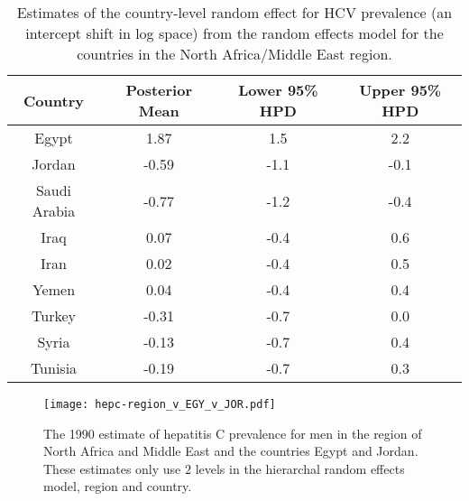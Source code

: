     \begin{table}[h]
        \begin{center}
        \begin{tabular}{|c|c|c|c|}
            \hline
                Country & Posterior Mean & Lower 95\% HPD  & Upper 95\%  HPD \\
            \hline
                Egypt	&	1.87	&	 1.5	&	2.2	\\
                Jordan	&	-0.59	&	-1.1	&	-0.1 \\
                Saudi Arabia	&	-0.77	&	-1.2	&	-0.4 \\
                Iraq	&	0.07	&	-0.4	&	0.6	\\
                Iran	&	0.02	&	-0.4	&	0.5	\\
                Yemen	&	0.04	&	-0.4	&	0.4	\\
                Turkey	&	-0.31	&	-0.7	&	0.0	\\
                Syria	&	-0.13	&	-0.7	&	0.4	\\
                Tunisia	&	-0.19	&	-0.7	&	0.3	\\
            \hline
        \end{tabular}
        \end{center}
        \caption{ Estimates of the country-level random effect for HCV
          prevalence (an intercept shift in log space) from the random
          effects model for the countries in the North Africa/Middle
          East region.}
        \label{tab:app-hepc regional rfx}
    \end{table}

    \begin{figure}[h]
        \begin{center}
            \texttt{[image: hepc-region\_v\_EGY\_v\_JOR.pdf]}
            \caption{The 1990 estimate of hepatitis C prevalence for
              men in the region of North Africa and Middle East and
              the countries Egypt and Jordan.  These estimates only
              use $2$ levels in the hierarchal random effects
              model, region and country.}
            \label{fig:app-hepc regional rfx}
        \end{center}
    \end{figure}

